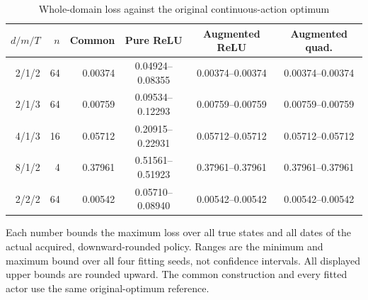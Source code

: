 \begin{table}[htbp]
\centering
\caption{Whole-domain loss against the original continuous-action optimum}\label{tab:accuracy62}
{\small\setlength{\tabcolsep}{3pt}
\begin{tabular}{rrrccc}
\hline
$d/m/T$ & $n$ & Common & Pure ReLU & Augmented ReLU & Augmented quad. \\
\hline
2/1/2 & 64 & 0.00374 & 0.04924--0.08355 & 0.00374--0.00374 & 0.00374--0.00374 \\
2/1/3 & 64 & 0.00759 & 0.09534--0.12293 & 0.00759--0.00759 & 0.00759--0.00759 \\
4/1/3 & 16 & 0.05712 & 0.20915--0.22931 & 0.05712--0.05712 & 0.05712--0.05712 \\
8/1/2 & 4 & 0.37961 & 0.51561--0.51923 & 0.37961--0.37961 & 0.37961--0.37961 \\
2/2/2 & 64 & 0.00542 & 0.05710--0.08940 & 0.00542--0.00542 & 0.00542--0.00542 \\
\hline
\end{tabular}}
\par\smallskip
{\footnotesize Each number bounds the maximum loss over all true states and all dates of the actual acquired, downward-rounded policy. Ranges are the minimum and maximum bound over all four fitting seeds, not confidence intervals. All displayed upper bounds are rounded upward. The common construction and every fitted actor use the same original-optimum reference.}
\end{table}
